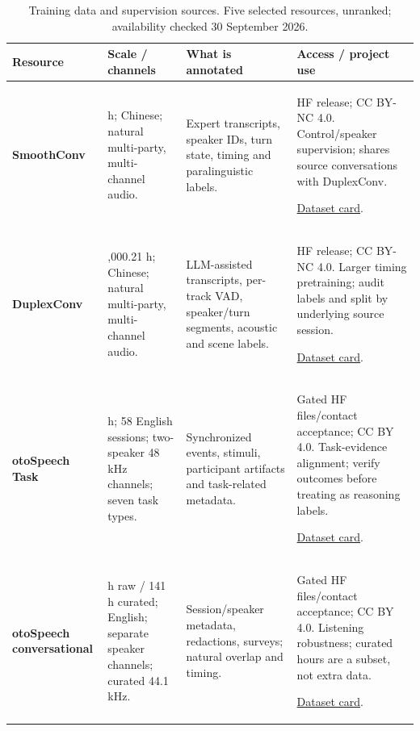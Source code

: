 \begin{table}[H]
\centering
\small
\setlength{\tabcolsep}{4pt}
\setlength{\tablewidth}{\dimexpr\linewidth-6\tabcolsep\relax}
\renewcommand{\arraystretch}{1.12}
\caption{Training data and supervision sources. Five selected resources, unranked; availability checked 30 September 2026.}
\label{tab:data}
\begin{tabular}{@{}>{\raggedright\arraybackslash}p{0.20\tablewidth}>{\raggedright\arraybackslash}p{0.22\tablewidth}>{\raggedright\arraybackslash}p{0.28\tablewidth}>{\raggedright\arraybackslash}p{0.30\tablewidth}@{}}
\toprule
\textbf{Resource} & \textbf{Scale / channels} & \textbf{What is annotated} & \textbf{Access / project use} \\
\midrule
\textbf{SmoothConv}\par\citep{smoothconv} & 100.53 h; Chinese; natural multi-party, multi-channel audio. & Expert transcripts, speaker IDs, turn state, timing and paralinguistic labels. & HF release; CC BY-NC 4.0. Control/speaker supervision; shares source conversations with DuplexConv.\par \href{https://huggingface.co/datasets/qualialabsAI/SmoothConv}{Dataset card}. \\
\addlinespace[4pt]
\textbf{DuplexConv}\par\citep{duplexconv} & 2,000.21 h; Chinese; natural multi-party, multi-channel audio. & LLM-assisted transcripts, per-track VAD, speaker/turn segments, acoustic and scene labels. & HF release; CC BY-NC 4.0. Larger timing pretraining; audit labels and split by underlying source session.\par \href{https://huggingface.co/datasets/OpenT2S/DuplexConv}{Dataset card}. \\
\addlinespace[4pt]
\textbf{otoSpeech Task}\par\citep{ototask} & 20.006 h; 58 English sessions; two-speaker 48 kHz channels; seven task types. & Synchronized events, stimuli, participant artifacts and task-related metadata. & Gated HF files/contact acceptance; CC BY 4.0. Task-evidence alignment; verify outcomes before treating as reasoning labels.\par \href{https://huggingface.co/datasets/otoearth/otoSpeech-full-duplex-task-oriented-20h}{Dataset card}. \\
\addlinespace[4pt]
\textbf{otoSpeech conversational}\par\citep{otoconv} & 280 h raw / 141 h curated; English; separate speaker channels; curated 44.1 kHz. & Session/speaker metadata, redactions, surveys; natural overlap and timing. & Gated HF files/contact acceptance; CC BY 4.0. Listening robustness; curated hours are a subset, not extra data.\par \href{https://huggingface.co/datasets/otoearth/otoSpeech-full-duplex-processed-141h}{Dataset card}. \\

\end{tabular}
\end{table}
